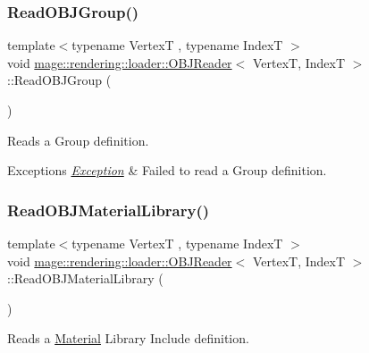 \subsubsection{\texorpdfstring{Read\+O\+B\+J\+Group()}{ReadOBJGroup()}}
{\footnotesize\ttfamily template$<$typename VertexT , typename IndexT $>$ \\
void \hyperlink{classmage_1_1rendering_1_1loader_1_1_o_b_j_reader}{mage\+::rendering\+::loader\+::\+O\+B\+J\+Reader}$<$ VertexT, IndexT $>$\+::Read\+O\+B\+J\+Group (\begin{DoxyParamCaption}{ }\end{DoxyParamCaption})\hspace{0.3cm}{\ttfamily [private]}}

Reads a Group definition.


\begin{DoxyExceptions}{Exceptions}
{\em \hyperlink{classmage_1_1_exception}{Exception}} & Failed to read a Group definition. \\
\hline
\end{DoxyExceptions}
\hypertarget{classmage_1_1rendering_1_1loader_1_1_o_b_j_reader_aa898eb5cac6a5e04b1da9329587a81cd}{}\label{classmage_1_1rendering_1_1loader_1_1_o_b_j_reader_aa898eb5cac6a5e04b1da9329587a81cd} 
\subsubsection{\texorpdfstring{Read\+O\+B\+J\+Material\+Library()}{ReadOBJMaterialLibrary()}}
{\footnotesize\ttfamily template$<$typename VertexT , typename IndexT $>$ \\
void \hyperlink{classmage_1_1rendering_1_1loader_1_1_o_b_j_reader}{mage\+::rendering\+::loader\+::\+O\+B\+J\+Reader}$<$ VertexT, IndexT $>$\+::Read\+O\+B\+J\+Material\+Library (\begin{DoxyParamCaption}{ }\end{DoxyParamCaption})\hspace{0.3cm}{\ttfamily [private]}}

Reads a \hyperlink{classmage_1_1rendering_1_1_material}{Material} Library Include definition.


